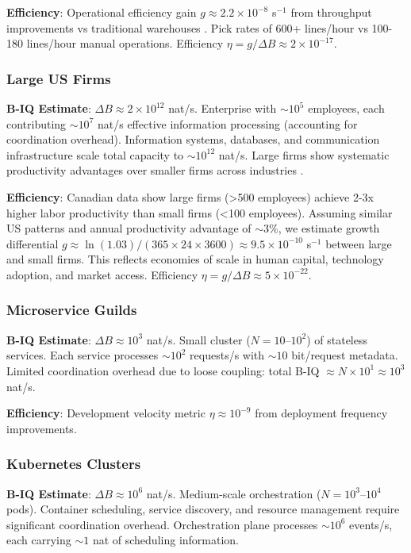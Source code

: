 \documentclass[10pt,conference]{IEEEtran}
\begin{document}
\textbf{Efficiency}: Operational efficiency gain $g \approx 2.2 \times 10^{-8}$ s$^{-1}$ from throughput improvements vs traditional warehouses \cite{wulfraat2012}. Pick rates of 600+ lines/hour vs 100-180 lines/hour manual operations. Efficiency $\eta = g/\Delta B \approx 2 \times 10^{-17}$.

\subsubsection{Large US Firms}
\textbf{B-IQ Estimate}: $\Delta B \approx 2 \times 10^{12}$ nat/s. Enterprise with $\sim 10^5$ employees, each contributing $\sim 10^7$ nat/s effective information processing (accounting for coordination overhead). Information systems, databases, and communication infrastructure scale total capacity to $\sim 10^{12}$ nat/s. Large firms show systematic productivity advantages over smaller firms across industries \cite{leung2008, haltiwanger1999}.

\textbf{Efficiency}: Canadian data \cite{leung2008, haltiwanger1999} show large firms (>500 employees) achieve 2-3x higher labor productivity than small firms (<100 employees). Assuming similar US patterns and annual productivity advantage of $\sim$3\%, we estimate growth differential $g \approx \ln(1.03)/(365 \times 24 \times 3600) \approx 9.5 \times 10^{-10}$ s$^{-1}$ between large and small firms. This reflects economies of scale in human capital, technology adoption, and market access. Efficiency $\eta = g/\Delta B \approx 5 \times 10^{-22}$.

\subsubsection{Microservice Guilds}
\textbf{B-IQ Estimate}: $\Delta B \approx 10^3$ nat/s. Small cluster ($N = 10$--$10^2$) of stateless services. Each service processes $\sim 10^2$ requests/s with $\sim 10$ bit/request metadata. Limited coordination overhead due to loose coupling: total B-IQ $\approx N \times 10^1 \approx 10^3$ nat/s.

\textbf{Efficiency}: Development velocity metric $\eta \approx 10^{-9}$ from deployment frequency improvements.

\subsubsection{Kubernetes Clusters}
\textbf{B-IQ Estimate}: $\Delta B \approx 10^6$ nat/s. Medium-scale orchestration ($N = 10^3$--$10^4$ pods). Container scheduling, service discovery, and resource management require significant coordination overhead. Orchestration plane processes $\sim 10^6$ events/s, each carrying $\sim 1$ nat of scheduling information.
\end{document}
